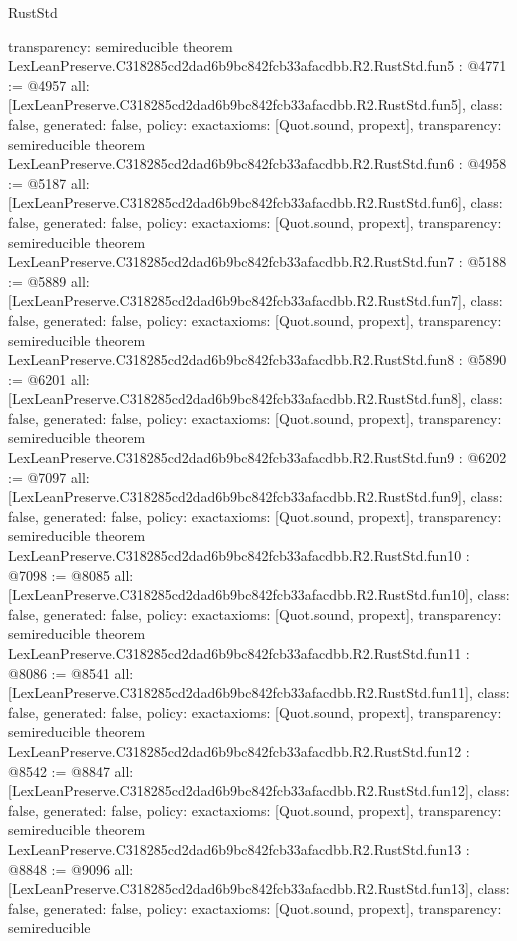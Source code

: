 \begin{lexlean}{RustStd}
\begin{coremodule}
{  transparency: semireducible
}
theorem LexLeanPreserve.C318285cd2dad6b9bc842fcb33afacdbb.R2.RustStd.fun5 : @4771 := @4957 {
  all: [LexLeanPreserve.C318285cd2dad6b9bc842fcb33afacdbb.R2.RustStd.fun5],
  class: false,
  generated: false,
  policy: exact{axioms: [Quot.sound, propext]},
  transparency: semireducible
}
theorem LexLeanPreserve.C318285cd2dad6b9bc842fcb33afacdbb.R2.RustStd.fun6 : @4958 := @5187 {
  all: [LexLeanPreserve.C318285cd2dad6b9bc842fcb33afacdbb.R2.RustStd.fun6],
  class: false,
  generated: false,
  policy: exact{axioms: [Quot.sound, propext]},
  transparency: semireducible
}
theorem LexLeanPreserve.C318285cd2dad6b9bc842fcb33afacdbb.R2.RustStd.fun7 : @5188 := @5889 {
  all: [LexLeanPreserve.C318285cd2dad6b9bc842fcb33afacdbb.R2.RustStd.fun7],
  class: false,
  generated: false,
  policy: exact{axioms: [Quot.sound, propext]},
  transparency: semireducible
}
theorem LexLeanPreserve.C318285cd2dad6b9bc842fcb33afacdbb.R2.RustStd.fun8 : @5890 := @6201 {
  all: [LexLeanPreserve.C318285cd2dad6b9bc842fcb33afacdbb.R2.RustStd.fun8],
  class: false,
  generated: false,
  policy: exact{axioms: [Quot.sound, propext]},
  transparency: semireducible
}
theorem LexLeanPreserve.C318285cd2dad6b9bc842fcb33afacdbb.R2.RustStd.fun9 : @6202 := @7097 {
  all: [LexLeanPreserve.C318285cd2dad6b9bc842fcb33afacdbb.R2.RustStd.fun9],
  class: false,
  generated: false,
  policy: exact{axioms: [Quot.sound, propext]},
  transparency: semireducible
}
theorem LexLeanPreserve.C318285cd2dad6b9bc842fcb33afacdbb.R2.RustStd.fun10 : @7098 := @8085 {
  all: [LexLeanPreserve.C318285cd2dad6b9bc842fcb33afacdbb.R2.RustStd.fun10],
  class: false,
  generated: false,
  policy: exact{axioms: [Quot.sound, propext]},
  transparency: semireducible
}
theorem LexLeanPreserve.C318285cd2dad6b9bc842fcb33afacdbb.R2.RustStd.fun11 : @8086 := @8541 {
  all: [LexLeanPreserve.C318285cd2dad6b9bc842fcb33afacdbb.R2.RustStd.fun11],
  class: false,
  generated: false,
  policy: exact{axioms: [Quot.sound, propext]},
  transparency: semireducible
}
theorem LexLeanPreserve.C318285cd2dad6b9bc842fcb33afacdbb.R2.RustStd.fun12 : @8542 := @8847 {
  all: [LexLeanPreserve.C318285cd2dad6b9bc842fcb33afacdbb.R2.RustStd.fun12],
  class: false,
  generated: false,
  policy: exact{axioms: [Quot.sound, propext]},
  transparency: semireducible
}
theorem LexLeanPreserve.C318285cd2dad6b9bc842fcb33afacdbb.R2.RustStd.fun13 : @8848 := @9096 {
  all: [LexLeanPreserve.C318285cd2dad6b9bc842fcb33afacdbb.R2.RustStd.fun13],
  class: false,
  generated: false,
  policy: exact{axioms: [Quot.sound, propext]},
  transparency: semireducible
}
\end{coremodule}
\end{lexlean}
